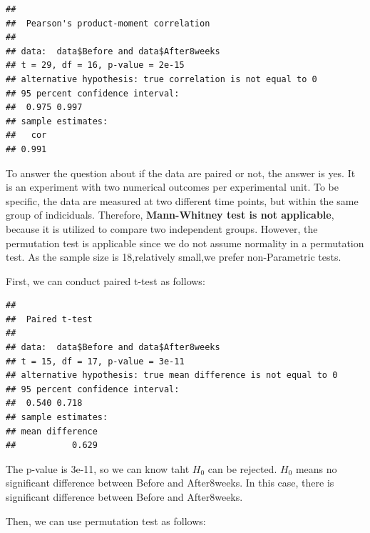 \documentclass[
]{article}
\newenvironment{Shaded}{\begin{snugshade}}{\end{snugshade}}
\newcommand{\AttributeTok}[1]{\textcolor[rgb]{0.13,0.29,0.53}{#1}}
\newcommand{\ConstantTok}[1]{\textcolor[rgb]{0.56,0.35,0.01}{#1}}
\newcommand{\FunctionTok}[1]{\textcolor[rgb]{0.13,0.29,0.53}{\textbf{#1}}}
\newcommand{\NormalTok}[1]{#1}
\newcommand{\SpecialCharTok}[1]{\textcolor[rgb]{0.81,0.36,0.00}{\textbf{#1}}}
\begin{document}
\begin{verbatim}
## 
##  Pearson's product-moment correlation
## 
## data:  data$Before and data$After8weeks
## t = 29, df = 16, p-value = 2e-15
## alternative hypothesis: true correlation is not equal to 0
## 95 percent confidence interval:
##  0.975 0.997
## sample estimates:
##   cor 
## 0.991
\end{verbatim}

To answer the question about if the data are paired or not, the answer
is yes. It is an experiment with two numerical outcomes per experimental
unit. To be specific, the data are measured at two different time
points, but within the same group of indiciduals. Therefore,
\textbf{Mann-Whitney test is not applicable}, because it is utilized to
compare two independent groups. However, the permutation test is
applicable since we do not assume normality in a permutation test. As
the sample size is 18,relatively small,we prefer non-Parametric tests.

First, we can conduct paired t-test as follows:

\begin{Shaded}
\end{Shaded}

\begin{verbatim}
## 
##  Paired t-test
## 
## data:  data$Before and data$After8weeks
## t = 15, df = 17, p-value = 3e-11
## alternative hypothesis: true mean difference is not equal to 0
## 95 percent confidence interval:
##  0.540 0.718
## sample estimates:
## mean difference 
##           0.629
\end{verbatim}

The p-value is 3e-11, so we can know taht \(H_0\) can be rejected.
\(H_0\) means no significant difference between Before and After8weeks.
In this case, there is significant difference between Before and
After8weeks.

Then, we can use permutation test as follows:
\end{document}
